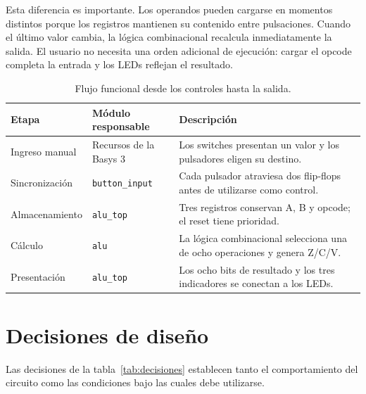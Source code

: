 Esta diferencia es importante. Los operandos pueden cargarse en
momentos distintos porque los registros mantienen su contenido entre
pulsaciones. Cuando el último valor cambia, la lógica combinacional
recalcula inmediatamente la salida. El usuario no necesita una orden
adicional de ejecución: cargar el opcode completa la entrada y los
LEDs reflejan el resultado.

\begin{table}[H]
	\centering
	\begin{tabularx}{\textwidth}{L{3.2cm}L{3.5cm}Y}
		\toprule
		\textbf{Etapa} & \textbf{Módulo responsable} & \textbf{Descripción} \\
		\midrule
		Ingreso manual & Recursos de la Basys 3 & Los switches presentan un
		valor y los pulsadores eligen su destino. \\
		Sincronización & \texttt{button\_input} & Cada pulsador atraviesa
		dos flip-flops antes de utilizarse como control. \\
		Almacenamiento & \texttt{alu\_top} & Tres registros conservan A, B
		y opcode; el reset tiene prioridad. \\
		Cálculo & \texttt{alu} & La lógica combinacional selecciona una de
		ocho operaciones y genera Z/C/V. \\
		Presentación & \texttt{alu\_top} & Los ocho bits de resultado y los
		tres indicadores se conectan a los LEDs. \\
		\bottomrule
	\end{tabularx}
	\caption{Flujo funcional desde los controles hasta la salida.}
\end{table}

\clearpage
\section{Decisiones de diseño}

Las decisiones de la tabla~\ref{tab:decisiones} establecen tanto el
comportamiento del circuito como las condiciones bajo las cuales debe
utilizarse.

